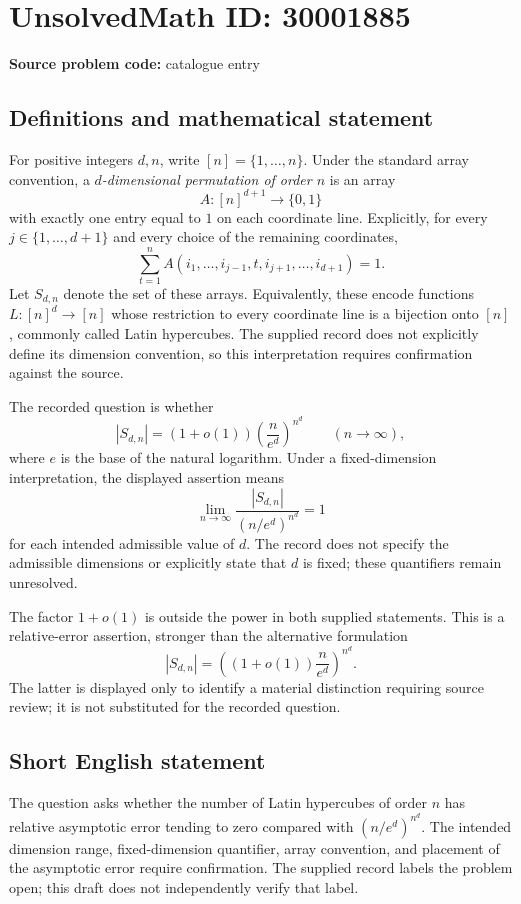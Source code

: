 \documentclass[11pt]{article}
\begin{document}
\section*{UnsolvedMath ID: 30001885}
\textbf{Source problem code:} catalogue entry
\subsection{Definitions and mathematical statement}
For positive integers \(d,n\), write \([n]=\{1,\ldots,n\}\). Under the standard array convention, a \emph{\(d\)-dimensional permutation of order \(n\)} is an array
\[
A:[n]^{d+1}\longrightarrow\{0,1\}
\]
with exactly one entry equal to \(1\) on each coordinate line. Explicitly, for every \(j\in\{1,\ldots,d+1\}\) and every choice of the remaining coordinates,
\[
\sum_{t=1}^{n}A(i_1,\ldots,i_{j-1},t,i_{j+1},\ldots,i_{d+1})=1.
\]
Let \(S_{d,n}\) denote the set of these arrays. Equivalently, these encode functions \(L:[n]^d\to[n]\) whose restriction to every coordinate line is a bijection onto \([n]\), commonly called Latin hypercubes. The supplied record does not explicitly define its dimension convention, so this interpretation requires confirmation against the source.

The recorded question is whether
\[
|S_{d,n}|=(1+o(1))\left(\frac{n}{e^d}\right)^{n^d}
\qquad(n\to\infty),
\]
where \(e\) is the base of the natural logarithm. Under a fixed-dimension interpretation, the displayed assertion means
\[
\lim_{n\to\infty}\frac{|S_{d,n}|}{(n/e^d)^{n^d}}=1
\]
for each intended admissible value of \(d\). The record does not specify the admissible dimensions or explicitly state that \(d\) is fixed; these quantifiers remain unresolved.

The factor \(1+o(1)\) is outside the power in both supplied statements. This is a relative-error assertion, stronger than the alternative formulation
\[
|S_{d,n}|=\left((1+o(1))\frac{n}{e^d}\right)^{n^d}.
\]
The latter is displayed only to identify a material distinction requiring source review; it is not substituted for the recorded question.
\subsection{Short English statement}
The question asks whether the number of Latin hypercubes of order \(n\) has relative asymptotic error tending to zero compared with \((n/e^d)^{n^d}\). The intended dimension range, fixed-dimension quantifier, array convention, and placement of the asymptotic error require confirmation. The supplied record labels the problem open; this draft does not independently verify that label.
\end{document}
